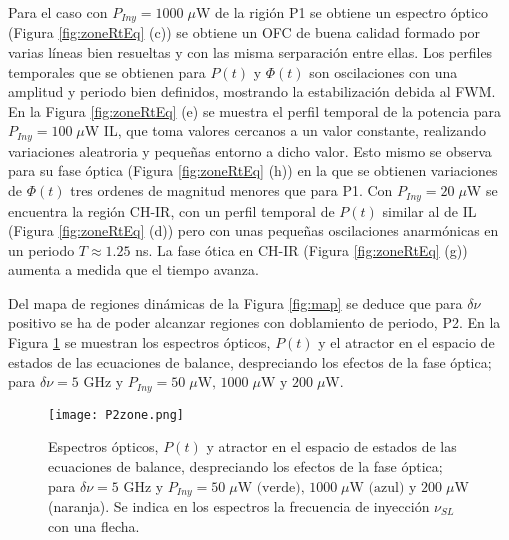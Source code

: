 		Para el caso con $P_{Iny} = 1000\;\mu$W de la rigión P1 se obtiene un espectro óptico (Figura \ref{fig:zoneRtEq} (c)) se obtiene un OFC de buena calidad formado por varias líneas bien resueltas y con las misma serparación entre ellas. Los perfiles temporales que se obtienen para $P(t)$ y $\Phi(t)$ son oscilaciones con una amplitud y periodo bien definidos, mostrando la estabilización debida al FWM. En la Figura \ref{fig:zoneRtEq} (e)  se muestra el perfil temporal de la potencia para $P_{Iny} = 100\;\mu$W IL, que toma valores cercanos a un valor constante, realizando variaciones aleatroria y pequeñas entorno a dicho valor. Esto mismo se observa para su fase óptica (Figura \ref{fig:zoneRtEq} (h)) en la que se obtienen variaciones de $\Phi(t)$ tres ordenes de magnitud menores que para P1. Con $P_{Iny} = 20\;\mu$W se encuentra la región CH-IR, con un perfil temporal de $P(t)$ similar al de IL (Figura \ref{fig:zoneRtEq} (d)) pero con unas pequeñas oscilaciones anarmónicas en un periodo $T \approx 1.25$ ns. La fase ótica en CH-IR (Figura \ref{fig:zoneRtEq} (g)) aumenta a medida que el tiempo avanza.

		Del mapa de regiones dinámicas de la Figura \ref{fig:map} se deduce que para $\delta\nu$ positivo se ha de poder alcanzar regiones con doblamiento de periodo, P2. En la Figura \ref{fig:P2zone} se muestran los espectros ópticos, $P(t)$ y el atractor en el espacio de estados de las ecuaciones de balance, despreciando los efectos de la fase óptica; para $\delta\nu = 5$ GHz y $P_{Iny} = 50\;\mu \textrm{W, } 1000\;\mu\textrm{W y } 200\;\mu$W.

			\begin{figure}[H]
				\centering
				\texttt{[image: P2zone.png]}
				\caption{\label{fig:P2zone}Espectros ópticos, $P(t)$ y atractor en el espacio de estados de las ecuaciones de balance, despreciando los efectos de la fase óptica; para $\delta\nu = 5$ GHz y $P_{Iny} = 50\;\mu \textrm{W (verde), } 1000\;\mu\textrm{W (azul) y } 200\;\mu$W (naranja). Se indica en los espectros la frecuencia de inyección $\nu_{SL}$ con una flecha.}	
			\end{figure}

